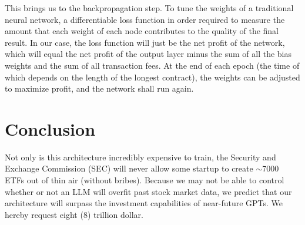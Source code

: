 \documentclass[12pt]{article}
\begin{document}
This brings us to the backpropagation step. To tune the weights of a traditional neural network, a differentiable loss function in order required to measure the amount that each weight of each node contributes to the quality of the final result. In our case, the loss function will just be the net profit of the network, which will equal the net profit of the output layer minus the sum of all the bias weights and the sum of all transaction fees. At the end of each epoch (the time of which depends on the length of the longest contract), the weights can be adjusted to maximize profit, and the network shall run again.
\section{Conclusion}
Not only is this architecture incredibly expensive to train, the Security and Exchange Commission (SEC) will never allow some startup to create $\sim$7000 ETFs out of thin air (without bribes). Because we may not be able to control whether or not an LLM will overfit past stock market data, we predict that our architecture will surpass the investment capabilities of near-future GPTs. We hereby request eight (8) trillion dollar.
\end{document}
